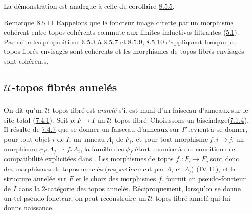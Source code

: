 \documentclass[10pt]{../fichiers-configuration-latex/smfart}
\begin{document}
La démonstration est analogue à celle du corollaire \hyperref[VI.cor8.5.5]{8.5.5}.

\begin{enonce*}[remark]{Remarque 8.5.11}
Rappelons que le foncteur image directe par un morphisme cohérent
entre topos cohérents commute aux limites inductives filtrantes
(\hyperref[VI.thm5.1]{5.1}). Par suite les propositions \hyperref[VI.prop8.5.3]{8.5.3} à \hyperref[VI.cor8.5.7]{8.5.7} et
\hyperref[VI.prop8.5.9]{8.5.9}, \hyperref[VI.cor8.5.10]{8.5.10}
s'appliquent lorsque les topos fibrés envisagés sont cohérents et les
morphismes de topos fibrés envisagés sont cohérents.
\end{enonce*}

\subsection{$𝒰$-topos fibrés annelés}

\subsubsection{}

On dit qu'un $𝒰$-topos fibré est \emph{annelé} s'il est muni
d'un faisceau d'anneaux sur le site total (\hyperref[VI.def7.4.1]{7.4.1}). Soit
$p : F \to I$ un $𝒰$-topos fibré. Choisissons un
biscindage\pageoriginale (\hyperref[VI.subsubsec7.1.4]{7.1.4}). Il résulte de
\hyperref[VI.prop7.4.7]{7.4.7} que se donner un faisceau d'anneaux sur $F$
revient à se donner, pour tout objet $i$ de $I$, un anneau $A_i$ de
$F_i$, et pour tout morphisme $f : i \to j$, un morphisme $\phi_f :
A_j \to f_{\ast} A_i$, la famille des $\phi_f$ étant soumise à des
conditions de compatibilité explicitées dans \loccit. Les morphismes
de topos $f. : F_i \to F_j$ sont donc des morphismes de topos
annelés (respectivement par $A_i$ et $A_j$) (IV 11), et la structure
annelée sur $F$ et le choix des morphismes $f$. fournit un
pseudo-foncteur de $I$ dans la 2-catégorie des topos annelés.
Réciproquement, lorsqu'on se donne un tel pseudo-foncteur, on peut
reconstruire un $𝒰$-topos fibré annelé qui lui donne
naissance.

\subsubsection{}
\end{document}
